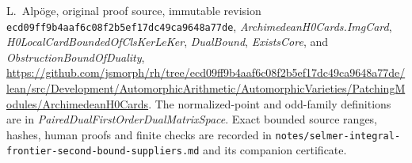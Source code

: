 L.~Alp\"oge, original proof source, immutable revision
\texttt{ecd09ff9b4aaf6c08f2b5ef17dc49ca9648a77de},
\emph{ArchimedeanH0Cards.ImgCard},
\emph{H0LocalCardBoundedOfClsKerLeKer}, \emph{DualBound},
\emph{ExistsCore}, and \emph{ObstructionBoundOfDuality},
\url{https://github.com/jsmorph/rh/tree/ecd09ff9b4aaf6c08f2b5ef17dc49ca9648a77de/lean/src/Development/AutomorphicArithmetic/AutomorphicVarieties/PatchingModules/ArchimedeanH0Cards}.
The normalized-point and odd-family definitions are in
\emph{PairedDualFirstOrderDualMatrixSpace}.
Exact bounded source ranges, hashes, human proofs and finite checks
are recorded in
\texttt{notes/selmer-integral-frontier-second-bound-suppliers.md}
and its companion certificate.
